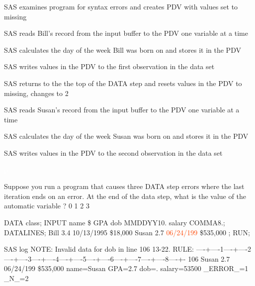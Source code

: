 \begin{frame}
\hspace{0.1in}
\emp
{}
\begin{itemize}
\footnotesize{
\item[Compile]  SAS examines program for syntax errors and creates PDV with values set to missing
\item[Execution 1]SAS reads Bill's record from the input buffer to the PDV one variable at a time
\item[Execution 2]SAS calculates the day of the week Bill was born on and stores it in the PDV
\item[Execution 3]SAS writes values in the PDV to the first observation in the  data set
\item[Execution 4]SAS returns to the the top of the DATA step and resets values in the PDV to missing,  changes to 2
\item[Execution 5]SAS reads Susan's record from the input buffer to the PDV one variable at a time
\item[Execution 6]SAS calculates the day of the week Susan was born on and stores it in the PDV
\item[Execution 7]SAS writes values in the PDV to the second observation in the  data set
\item[Cycle Ends]\textcolor{white}{p}}
\end{itemize}
\emp
\end{frame}

\begin{frame}
\begin{clicker}{Suppose you run a program that causes three DATA step errors where the last iteration ends on an error. At the end of the data step, what is the value of the automatic variable
?}
0   \hspace{0.2in} 1  \hspace{0.2in} 2 \hspace{0.2in}  3
\end{clicker}
\end{frame}

\begin{frame}[fragile]
\footnotesize
\begin{code}{.0}
DATA class;
  INPUT name \$ GPA dob MMDDYY10. salary COMMA8.;
  DATALINES;
  Bill  3.4 10/13/1995  \$18,000
  Susan 2.7 \textcolor{OrangeRed}{06/24/199}  \$535,000
  ;
RUN;
\end{code}
\emp 
\vspace{2ex}
\footnotesize
\begin{craw}{.0}{SAS log}
NOTE: Invalid data for dob in line 106 13-22.
RULE:      ----+----1----+----2----+----3----+----4----+----5----+----6----+----7----+----8----+-
106          Susan 2.7 06/24/199  \$535,000
name=Susan GPA=2.7 dob=. salary=53500 _ERROR_=1 _N_=2
\end{craw}
\emp
\end{frame}

